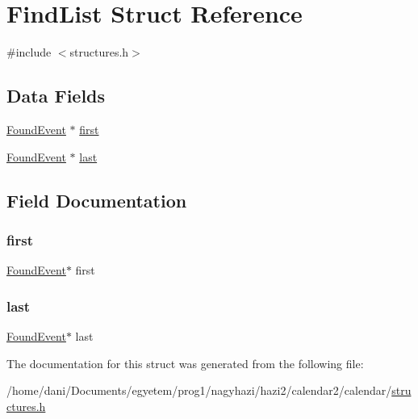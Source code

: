 \hypertarget{struct_find_list}{}\section{Find\+List Struct Reference}
\label{struct_find_list}


{\ttfamily \#include $<$structures.\+h$>$}

\subsection*{Data Fields}
\begin{DoxyCompactItemize}
\item 
\hyperlink{struct_found_event}{Found\+Event} $\ast$ \hyperlink{struct_find_list_a9f9781ae49412999177095cb5e8c79d1}{first}
\item 
\hyperlink{struct_found_event}{Found\+Event} $\ast$ \hyperlink{struct_find_list_ab61e64643b8233c6d9feef3e2aaffef2}{last}
\end{DoxyCompactItemize}


\subsection{Field Documentation}
\mbox{\label{struct_find_list_a9f9781ae49412999177095cb5e8c79d1}} 
\subsubsection{\texorpdfstring{first}{first}}
{\footnotesize\ttfamily \hyperlink{struct_found_event}{Found\+Event}$\ast$ first}

\mbox{\label{struct_find_list_ab61e64643b8233c6d9feef3e2aaffef2}} 
\subsubsection{\texorpdfstring{last}{last}}
{\footnotesize\ttfamily \hyperlink{struct_found_event}{Found\+Event}$\ast$ last}



The documentation for this struct was generated from the following file\+:\begin{DoxyCompactItemize}
\item 
/home/dani/\+Documents/egyetem/prog1/nagyhazi/hazi2/calendar2/calendar/\hyperlink{structures_8h}{structures.\+h}\end{DoxyCompactItemize}
